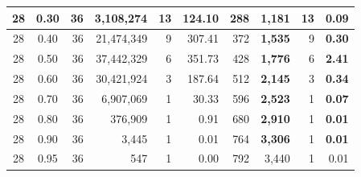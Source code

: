 \begin{table}[H]
\begin{tabular}{|c|c|r|r|r|r|r|r|r|r|}
        28                              & 0.30                               & 36                                              & 3,108,274                                        & 13            & 124.10        & 288           & \textbf{1,181}   & 13            & \textbf{0.09} \\ \hline
        28                              & 0.40                               & 36                                              & 21,474,349                                       & 9             & 307.41        & 372           & \textbf{1,535}   & 9             & \textbf{0.30} \\ \hline
        28                              & 0.50                               & 36                                              & 37,442,329                                       & 6             & 351.73        & 428           & \textbf{1,776}   & 6             & \textbf{2.41} \\ \hline
        28                              & 0.60                               & 36                                              & 30,421,924                                       & 3             & 187.64        & 512           & \textbf{2,145}   & 3             & \textbf{0.34} \\ \hline
        28                              & 0.70                               & 36                                              & 6,907,069                                        & 1             & 30.33         & 596           & \textbf{2,523}   & 1             & \textbf{0.07} \\ \hline
        28                              & 0.80                               & 36                                              & 376,909                                          & 1             & 0.91          & 680           & \textbf{2,910}   & 1             & \textbf{0.01} \\ \hline
        28                              & 0.90                               & 36                                              & 3,445                                            & 1             & 0.01          & 764           & \textbf{3,306}   & 1             & \textbf{0.01} \\ \hline
        28                              & 0.95                               & 36                                              & 547                                              & 1             & 0.00          & 792           & 3,440            & 1             & 0.01          \\ \hline
    \end{tabular}
\end{table}

